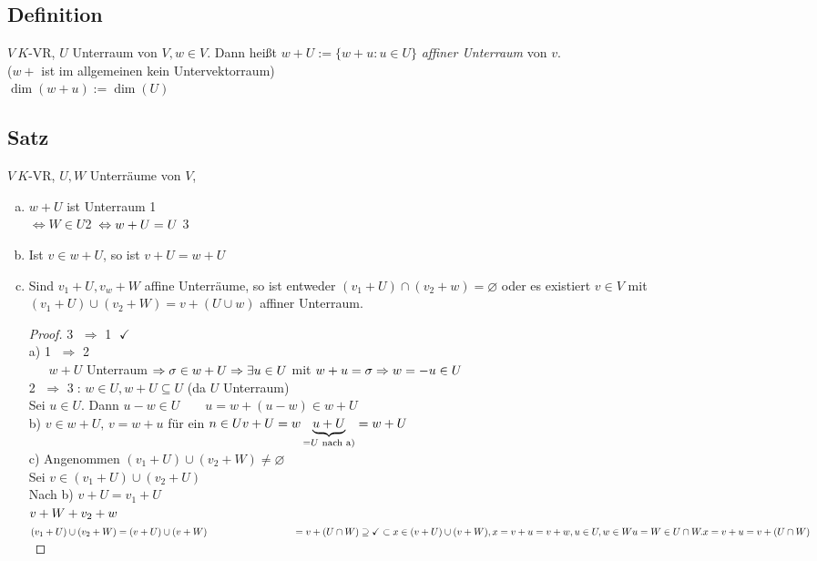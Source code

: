 \subsection{Definition}
$V\ K$-VR, $U$ Unterraum von $V, w \in V.$ Dann hei\ss t $w + U := \{w + u :u \in U \}$ \emph{affiner Unterraum}  von $v$.\\
($w+$ ist im allgemeinen kein Untervektorraum)\\
$\dim(w+u) := \dim(U)$
\subsection{Satz}
$V\ K$-VR, $U,W$ Unterräume von $V$,
\begin{enumerate}[a)]
\item $w + U$ ist Unterraum \hfill \textcircled{1}\\
$\Leftrightarrow W \in U$\hfill\textcircled{2}$\\
\Leftrightarrow w + U = U$ \hfill \textcircled{3}
\item Ist $v \in w + U$, so ist $v + U = w + U$
\item Sind $v_1 + U , v_w + W$ affine Unterräume, so ist entweder $(v_1 + U) \cap (v_2 + w) = \varnothing$ oder es existiert $v \in V$ mit $(v_1 + U) \cup (v_2 + W) = v + (U \cup w)$ affiner Unterraum.
\begin{proof} \textcircled{3} $\Rightarrow$ \textcircled{1} $\checkmark$\\
a) \textcircled{1} $\Rightarrow$ \textcircled{2}\\
$\phantom\Rightarrow w + U$ Unterraum $\Rightarrow \sigma \in w + U\\
\Rightarrow\exists u \in U$ mit $w + u = \sigma\\
\Rightarrow w = - u \in U$\\
\textcircled{2} $\Rightarrow$ \textcircled{3}: $w \in U, w + U \subseteq U$ (da $U$ Unterraum)\\
Sei $u \in U$. Dann $u-w \in U\qquad u = w + (u-w) \in w + U$\\
b) $v \in w + U,\, v = w + u$ für ein $n \in U\\
v + U = w \underbrace{u+U}_{= U\text{ nach a)}} = w +U$\\
c) Angenommen $(v_1 + U) \cup (v_2 + W) \ne \varnothing$\\
Sei $v \in (v_1 + U) \cup (v_2 + U)$\\
Nach b) $v+U = v_1 + U$\\
\phantom{Nach b)} $v+W +v_2 +w\\
$\newpage
$(v_1 + U) \cup (v_2 + W) = (v+ U) \cup (v+W)\\
\phantom{(v_1 + U) \cup (v_2 + W)} = v + (U \cap W)\\
\supseteq \checkmark\\
\subset x \in (v+ U) \cup (v+ W), x= v+ u = v + w, u \in U,w\in W\\
u = W \in U \cap W.\\
x = v + u  = v + (U \cap W)$
\end{proof}
\end{enumerate}
